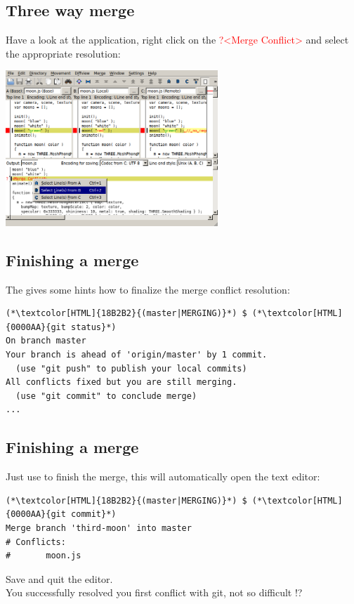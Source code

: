 \subsection{Three way merge}
\begin{frame}[fragile]
  \subslidetitle
  Have a look at the  application, right click on the \textcolor{red}{?<Merge Conflict>} and select the appropriate resolution:
  \newline \vspace{1em}
  \centerline{\includegraphics[width=8cm]{../screen/git-mergetool-kdiff3-resolve.png}}

\end{frame}

\subsection{Finishing a merge}
\begin{frame}[fragile]
  \subslidetitle
  The  gives some hints how to finalize the merge conflict resolution:
  \begin{lstlisting}
(*\textcolor[HTML]{18B2B2}{(master|MERGING)}*) $ (*\textcolor[HTML]{0000AA}{git status}*)
On branch master
Your branch is ahead of 'origin/master' by 1 commit.
  (use "git push" to publish your local commits)
All conflicts fixed but you are still merging.
  (use "git commit" to conclude merge)
...
\end{lstlisting}
\end{frame}

\subsection{Finishing a merge}
\begin{frame}[fragile]
  \subslidetitle

  Just use  to finish the merge, this will automatically open the text editor:
  \begin{lstlisting}
(*\textcolor[HTML]{18B2B2}{(master|MERGING)}*) $ (*\textcolor[HTML]{0000AA}{git commit}*)
Merge branch 'third-moon' into master
# Conflicts:
#       moon.js
\end{lstlisting}
  Save and quit the editor.
  \\
  \vspace{1em}
  You successfully resolved you first conflict with git, not so difficult !?

\end{frame}

